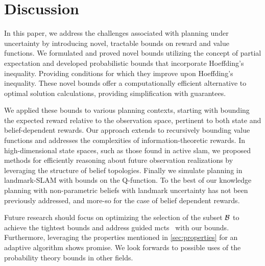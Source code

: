\chapter{Discussion}
\label{sec:discussion}
In this paper, we address the challenges associated with planning under uncertainty by introducing novel, tractable bounds on reward and value functions. We formulated and proved novel bounds utilizing the concept of partial expectation and developed probabilistic bounds that incorporate Hoeffding's inequality. Providing conditions for which they improve upon Hoeffding's inequality. These novel bounds offer a computationally efficient alternative to optimal solution calculations, providing simplification with guarantees.

We applied these bounds to various planning contexts, starting with bounding the expected reward relative to the observation space, pertinent to both state and belief-dependent rewards. Our approach extends to recursively bounding value functions and addresses the complexities of information-theoretic rewards. In high-dimensional state spaces, such as those found in active \gls{slam}, we proposed methods for efficiently reasoning about future observation realizations by leveraging the structure of belief topologies. Finally we simulate planning in landmark-SLAM with bounds on the Q-function. To the best of our knowledge planning with non-parametric beliefs with landmark uncertainty has not been previously addressed, and more-so for the case of belief dependent rewards.

Future research should focus on optimizing the selection of the subset $\mathcal B$ to achieve the tightest bounds and address guided \gls{mcts}~\cite{Silver10nips} with our bounds. Furthermore, leveraging the properties mentioned in \cref{sec:properties} for an adaptive algorithm shows promise. We look forwards to possible uses of the probability theory bounds in other fields.
